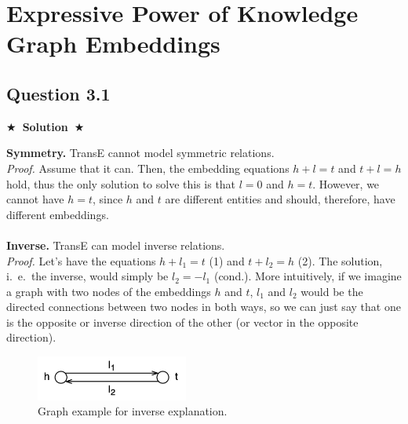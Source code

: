 \documentclass{article}
\newcommand{\Solution}[1]{{\medskip \color{black} \bf $\bigstar$~\sf \textbf{Solution}~$\bigstar$ \sf #1 } \bigskip}
\begin{document}

\section{Expressive Power of Knowledge Graph Embeddings}

\subsection*{Question 3.1}
\Solution{

  \noindent
  \textbf{Symmetry.} TransE cannot model symmetric relations.
  \\
  \textit{Proof.} Assume that it can. Then, the embedding equations $h + l = t$ and $t + l = h$ hold, thus the only solution to solve this is that $l = 0$ and $h = t$.
  However, we cannot have $h = t$, since $h$ and $t$ are different entities and should, therefore, have different embeddings.
  \\
  \\
  \textbf{Inverse.} TransE can model inverse relations. 
  \\
  \textit{Proof.} Let's have the equations $h + l_1 = t$ (1) and $t + l_2 = h$ (2). The solution, i.~e.~the inverse, would simply be $l_2 = - l_1$ (cond.).
  More intuitively, if we imagine a graph with two nodes of the embeddings $h$ and $t$, $l_1$ and $l_2$ would be the directed connections between two nodes in both ways, so we can just say that one is the opposite or inverse direction of the other (or vector in the opposite direction).
  \begin{figure}[ht!]
    \centering
    \includegraphics[width=50mm]{Slike/3_a_2.png}
    \caption{Graph example for inverse explanation.}
  \end{figure}

}
\end{document}
